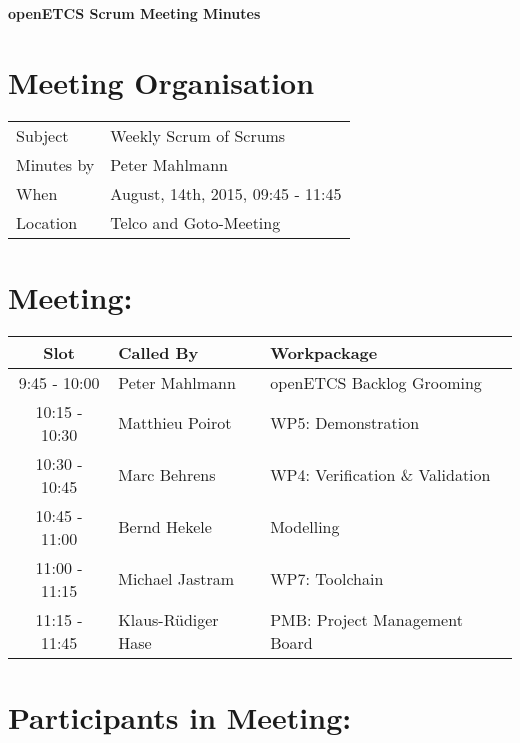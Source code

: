 \documentclass[a4paper, 11pt]{article}
\begin{document}
{\begin{center}\huge\bf openETCS Scrum Meeting Minutes\end{center}}
\section{Meeting Organisation}

\renewcommand{\arraystretch}{1.5}
\begin{supertabular}{m{.2\textwidth}m{.8\textwidth}}
Subject & Weekly Scrum of Scrums\\
Minutes by & Peter Mahlmann\\
When & August, 14th, 2015, 09:45 - 11:45\\
Location & Telco and Goto-Meeting\\
\end{supertabular}

\renewcommand{\arraystretch}{1.0}
\section{Meeting:}

\begin{tabular}{|c|l|l|}
\hline
\textbf{Slot} &  \textbf{Called By} & \textbf{Workpackage} \\
\hline  
9:45 - 10:00 & Peter Mahlmann & openETCS Backlog Grooming  \\\hline
10:15 - 10:30 & Matthieu Poirot & WP5: Demonstration \\\hline  
10:30 - 10:45 & Marc Behrens & WP4: Verification \& Validation \\\hline 
10:45 - 11:00 & Bernd Hekele & Modelling \\\hline
11:00 - 11:15 & Michael Jastram  & WP7: Toolchain \\\hline
11:15 - 11:45 & Klaus-R\"udiger Hase & PMB: Project Management Board \\\hline  
\end{tabular}

\section{Participants in Meeting:}
\end{document}
